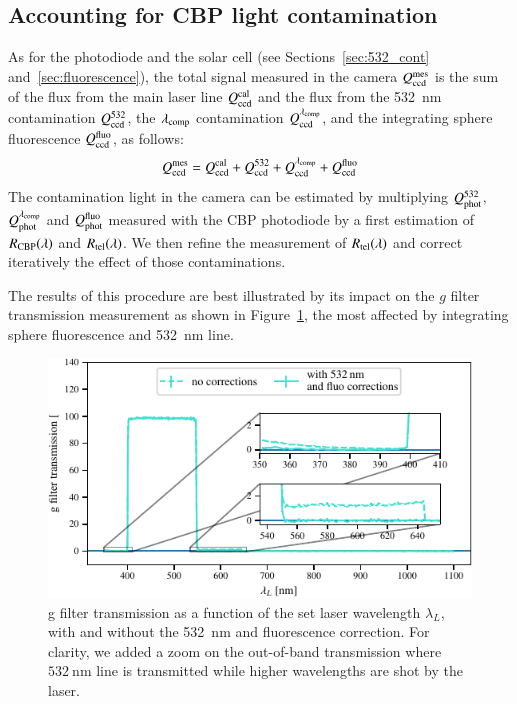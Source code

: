 \subsection{Accounting for CBP light contamination}\label{sec:sd_contaminations}

As for the photodiode and the solar cell (see Sections~\ref{sec:532_cont} and~\ref{sec:fluorescence}), the total signal measured in the \SD camera $Q_{\mathrm{ccd}}^{\mathrm{mes}}$ is the sum of the flux from the main laser line $Q_{\mathrm{ccd}}^{\mathrm{cal}}$ and the flux from the \SI{532}{\nm} contamination $Q_{\mathrm{ccd}}^{532}$, the $\lambda_{\rm comp}$ contamination $Q_{\mathrm{ccd}}^{\lambda_{\rm comp}}$, and the integrating sphere fluorescence $Q_{\mathrm{ccd}}^{\mathrm{fluo}}$, as follows:
\begin{equation}
    Q_{\mathrm{ccd}}^{\mathrm{mes}} = Q_{\mathrm{ccd}}^{\mathrm{cal}} + Q_{\mathrm{ccd}}^{532} + Q_{\mathrm{ccd}}^{\lambda_{\rm comp}} + Q_{\mathrm{ccd}}^{\mathrm{fluo}}
    \label{eq:qccd_mes}
\end{equation}
The contamination light in the \SD camera can be estimated by multiplying $Q_{\mathrm{phot}}^{532}$, $Q_{\mathrm{phot}}^{\lambda_{\rm comp}}$ and $Q_{\mathrm{phot}}^{\mathrm{fluo}}$ measured with the CBP photodiode by a first estimation of $R_{\mathrm{CBP}}(\lambda)$ and $R_{\mathrm{tel}}(\lambda)$. We then refine the measurement of $R_{\mathrm{tel}}(\lambda)$ and correct iteratively the effect of those contaminations.

The results of this procedure are best illustrated by its impact on the \SD $g$ filter transmission measurement as shown in Figure~\ref{fig:g_filter_532}, the most affected by integrating sphere fluorescence and \SI{532}{\nano\meter} line.

\begin{figure}[h]
    \centering
    \includegraphics[width=\columnwidth]{fig/g_filter_532.pdf}
    \caption{\SD g filter transmission as a function of the set laser wavelength $\lambda_L$, with and without the \SI{532}{\nm} and fluorescence correction. For clarity, we added a zoom on the out-of-band transmission where $\SI{532}{\nm}$ line is transmitted while higher wavelengths are shot by the laser.}
    \label{fig:g_filter_532}
\end{figure}


